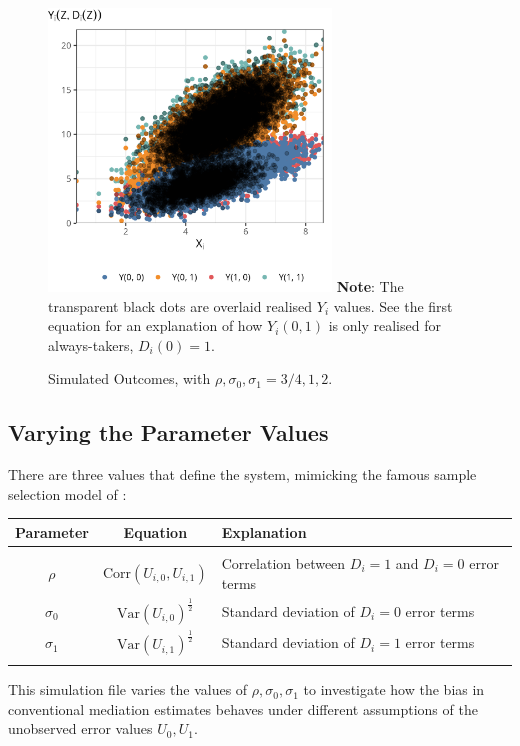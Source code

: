 \documentclass[a4paper, 12pt]{article}                                     %
\begin{document}
\begin{figure}[H]
    \centering
    \singlespacing
    \caption{Simulated Outcomes, with $\rho, \sigma_0, \sigma_1 = 3/4, 1, 2$.}
    \includegraphics[width=0.67\textwidth]{sim-output/outcomes-plot.png}
    \label{fig:outcomes-plot}
    \justify
    \footnotesize
    \textbf{Note}:
    The transparent black dots are overlaid realised $Y_i$ values.
    See the first equation for an explanation of how $Y_i(0, 1)$ is only realised for always-takers, $D_i(0) = 1$.
\end{figure}

\subsection{Varying the Parameter Values}

There are three values that define the system, mimicking the famous sample selection model of \cite{heckman1974shadow,heckman1979sample}:

\begin{table}[H]
    \centering
    \begin{tabular}{c c l}
        \toprule
        Parameter & Equation & Explanation \\
        \hline \\
        $\rho$ & $\text{Corr}(U_{i,0}, U_{i,1})$ &
            Correlation between $D_i = 1$ and $D_i = 0$ error terms \\
        $\sigma_0$ & $\text{Var}(U_{i,0})^{\frac12}$ &
            Standard deviation of $D_i = 0$ error terms \\
        $\sigma_1$ & $\text{Var}(U_{i,1})^{\frac12}$ &
            Standard deviation of $D_i = 1$ error terms \\
        \hline \\[-1.8ex]
    \end{tabular}
\end{table}
This simulation file varies the values of $\rho, \sigma_0, \sigma_1$ to investigate how the bias in conventional mediation estimates behaves under different assumptions of the unobserved error values $U_0, U_1$.
\end{document}
